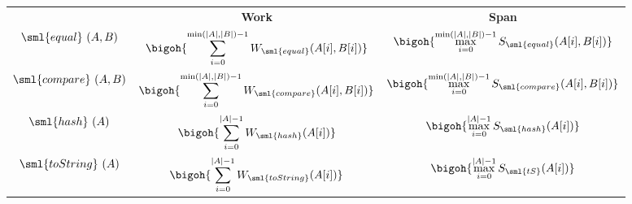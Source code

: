 \begin{costspec}[MkSeqElt]
\label{cost:sequence}
\begin{tabular}{c|c|c}
& \textbf{Work} & \textbf{Span} \\
$\sml{equal}~(A,B)$ & $\displaystyle \bigoh{\sum_{i=0}^{\min(|A|, |B|) - 1} W_{\sml{equal}}(A[i], B[i])}$ & $\displaystyle \bigoh {\max_{i=0}^{\min(|A|, |B|) - 1} S_{\sml{equal}} (A[i], B[i])}$ \\
$\sml{compare}~(A,B)$ & $\displaystyle \bigoh{\sum_{i=0}^{\min(|A|, |B|) - 1} W_{\sml{compare}}(A[i], B[i])}$ & $\displaystyle \bigoh {\max_{i=0}^{\min(|A|, |B|) - 1} S_{\sml{compare}} (A[i], B[i])}$ \\
$\sml{hash}~(A)$ & $\displaystyle \bigoh{\sum_{i=0}^{|A| - 1} W_{\sml{hash}}(A[i])}$ & $\displaystyle \bigoh {\max_{i=0}^{|A| - 1} S_{\sml{hash}} (A[i])}$ \\
$\sml{toString}~(A)$ & $\displaystyle \bigoh{\sum_{i=0}^{|A| - 1} W_{\sml{toString}}(A[i])}$ & $\displaystyle \bigoh {\max_{i=0}^{|A| - 1} S_{\sml{tS}} (A[i])}$ \\
\end{tabular}
\end{costspec}
        